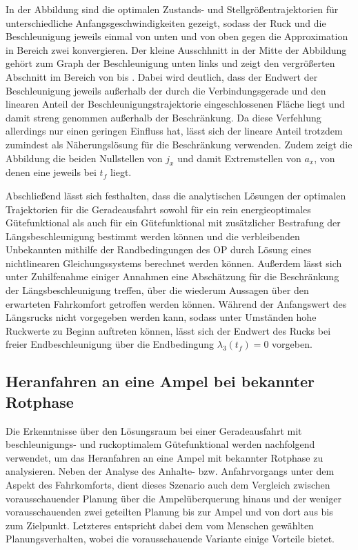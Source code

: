 In der Abbildung sind die optimalen Zustands- und Stellgrößentrajektorien für unterschiedliche Anfangsgeschwindigkeiten gezeigt, sodass der Ruck und die Beschleunigung jeweils einmal von unten und von oben gegen die Approximation in Bereich zwei konvergieren. Der kleine Ausschhnitt in der Mitte der Abbildung gehört zum Graph der Beschleunigung unten links und zeigt den vergrößerten Abschnitt im Bereich von  bis . Dabei wird deutlich, dass der Endwert der Beschleunigung jeweils außerhalb der durch die Verbindungsgerade und den linearen Anteil der Beschleunigungstrajektorie eingeschlossenen Fläche liegt und damit streng genommen außerhalb der Beschränkung. Da diese Verfehlung allerdings nur einen geringen Einfluss hat, lässt sich der lineare Anteil trotzdem zumindest als Näherungslösung für die Beschränkung verwenden. Zudem zeigt die Abbildung die beiden Nullstellen von $j_x$ und damit Extremstellen von $a_x$, von denen eine jeweils bei $t_f$ liegt.

Abschließend lässt sich festhalten, dass die analytischen Lösungen der optimalen Trajektorien für die Geradeausfahrt sowohl für ein rein energieoptimales Gütefunktional als auch für ein Gütefunktional mit zusätzlicher Bestrafung der Längsbeschleunigung bestimmt werden können und die verbleibenden Unbekannten mithilfe der Randbedingungen des \gls{OP} durch Lösung eines nichtlinearen Gleichungssystems berechnet werden können. Außerdem lässt sich unter Zuhilfenahme einiger Annahmen eine Abschätzung für die Beschränkung der Längsbeschleunigung treffen, über die wiederum Aussagen über den erwarteten Fahrkomfort getroffen werden können. Während der Anfangswert des Längsrucks nicht vorgegeben werden kann, sodass unter Umständen hohe Ruckwerte zu Beginn auftreten können, lässt sich der Endwert des Rucks bei freier Endbeschleunigung über die Endbedingung $\lambda_3(t_f) = 0$ vorgeben. 

\subsection{Heranfahren an eine Ampel bei bekannter Rotphase}\label{subsec:Ampelszenario}
Die Erkenntnisse über den Lösungsraum bei einer Geradeausfahrt mit beschleunigungs- und ruckoptimalem Gütefunktional werden nachfolgend verwendet, um das Heranfahren an eine Ampel mit bekannter Rotphase zu analysieren. Neben der Analyse des Anhalte- bzw. Anfahrvorgangs unter dem Aspekt des Fahrkomforts, dient dieses Szenario auch dem Vergleich zwischen vorausschauender Planung über die Ampelüberquerung hinaus und der weniger vorausschauenden zwei geteilten Planung bis zur Ampel und von dort aus bis zum Zielpunkt. Letzteres entspricht dabei dem vom Menschen gewählten Planungsverhalten, wobei die vorausschauende Variante einige Vorteile bietet. 

